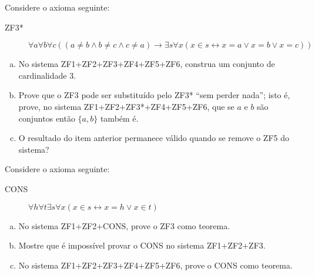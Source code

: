 \begin{exercise}
Considere o axioma seguinte:

\begin{description}
	\item[ZF3*] $\forall a \forall b \forall c \left( (a \ne b \land b \ne c \land c \ne a) \rightarrow \exists s \forall x(x \in s \leftrightarrow x=a \lor x=b \lor x=c)  \right)$
\end{description}

\begin{enumerate}[a)]
\item No sistema ZF1+ZF2+ZF3+ZF4+ZF5+ZF6, construa um conjunto de cardinalidade 3.
\item Prove que o ZF3 pode ser substituído pelo ZF3* ``sem perder nada''; isto é, prove, no sistema ZF1+ZF2+ZF3*+ZF4+ZF5+ZF6, que se $a$ e $b$ são conjuntos então $\{a,b\}$ também é.
\item O resultado do item anterior permanece válido quando se remove o ZF5 do sistema?
\end{enumerate}
\end{exercise}

\begin{exercise}
Considere o axioma seguinte:

\begin{description}
	\item[CONS] $\forall h \forall t \exists s \forall x (x \in s \leftrightarrow x=h \lor x \in t)$
\end{description}

\begin{enumerate}[a)]
\item No sistema ZF1+ZF2+CONS, prove o ZF3 como teorema.
\item Mostre que é impossível provar o CONS no sistema ZF1+ZF2+ZF3. 
\item No sistema ZF1+ZF2+ZF3+ZF4+ZF5+ZF6, prove o CONS como teorema.
\end{enumerate}
\end{exercise}